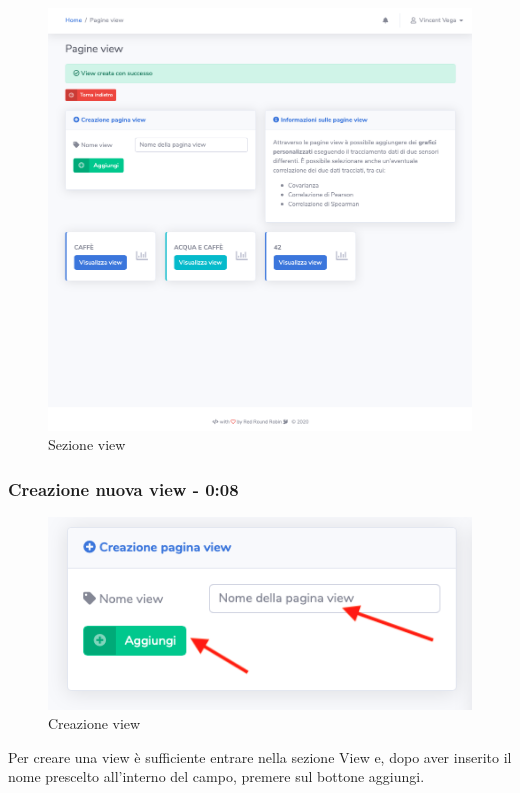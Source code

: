 	\begin{figure}[H]
		\centering
		\includegraphics[scale=0.400]{res/images/membro/view.png}
		\caption{Sezione view}
	\end{figure}

	\subsubsection{Creazione nuova view - 0:08}
	\begin{figure}[H]
		\centering
		\includegraphics[scale=0.600]{res/images/membro/creazView.png}
		\caption{Creazione view}
	\end{figure}
	Per creare una view è sufficiente entrare nella sezione View e, dopo aver inserito il nome prescelto all'interno del campo, premere sul bottone aggiungi.

